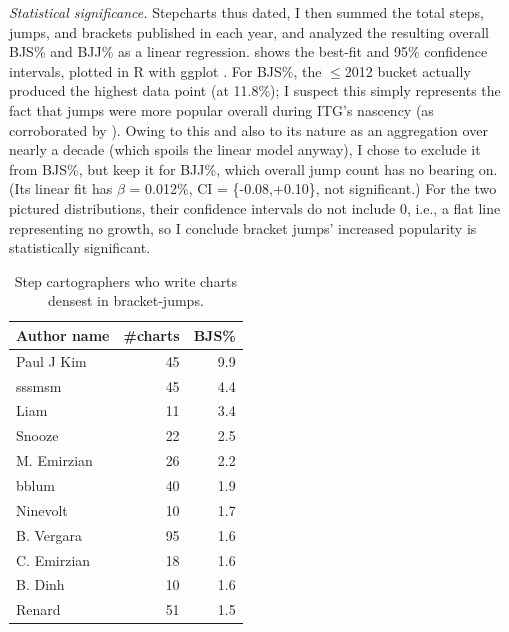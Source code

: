 \documentclass[10pt]{sigplanconf}
\begin{document}
\textit{Statistical significance.}
Stepcharts thus dated, I then summed the total steps, jumps, and brackets published in each year,
and analyzed the resulting overall BJS\% and BJJ\% as a linear regression.
 shows the best-fit and 95\% confidence intervals,
plotted in R \cite{r-lang} with ggplot \cite{ggplot}.
For BJS\%, the $\le$2012 bucket actually produced the highest data point (at 11.8\%);
I suspect this simply represents the fact that jumps were more popular overall during ITG's nascency
(as corroborated by ).
Owing to this and also to its nature as an aggregation over nearly a decade (which spoils the linear model anyway),
I chose to exclude it from BJS\%,
but keep it for BJJ\%, which overall jump count has no bearing on.
(Its linear fit has $\beta$ = 0.012\%, CI = \{-0.08,+0.10\}, not significant.)
For the two pictured distributions, their confidence intervals do not include 0,
i.e., a flat line representing no growth,
so I conclude bracket jumps' increased popularity is statistically significant.

\begin{table}[t]
	\begin{center}
		\small
	\begin{tabular}{l|r|r}
		\bf Author name & \bf \#charts & \bf BJS\% \\
		\hline
		Paul J Kim & 45 & 9.9 \\
		sssmsm & 45 & 4.4 \\
		Liam & 11 & 3.4 \\
		Snooze & 22 & 2.5 \\
		M. Emirzian & 26 & 2.2 \\
		bblum & 40 & 1.9 \\
		Ninevolt & 10 & 1.7 \\
		B. Vergara & 95 & 1.6 \\
		C. Emirzian & 18 & 1.6 \\
		B. Dinh & 10 & 1.6 \\
		Renard & 51 & 1.5 \\
	\end{tabular}
	\end{center}
	\caption{Step cartographers who write charts densest in bracket-jumps.}
	\label{tab:author-bjs}
\end{table}
\end{document}
